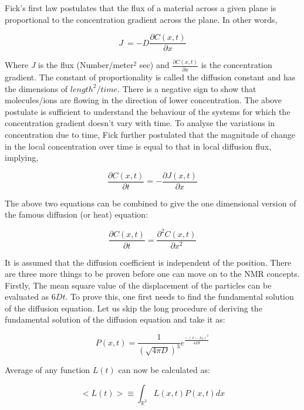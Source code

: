 		Fick's first law postulates that the flux of a material across a given
		plane is proportional to the concentration gradient across the plane.
		In other words,

		\begin{equation}
		J\ =-D\frac{\partial C(x,t)}{\partial x}
		\end{equation}


		Where \emph{J} is the flux (Number/meter$^{2}$ sec) and \emph{$\frac{\partial C(x,t)}{\partial x}$}
		is the concentration gradient. The constant of proportionality is
		called the diffusion constant and has the dimensions of $length^{2}/time$.
		There is a negative sign to show that molecules/ions are flowing in
		the direction of lower concentration. The above postulate is sufficient
		to understand the behaviour of the systems for which the concentration
		gradient doesn't vary with time. To analyse the variations in concentration
		due to time, Fick further postulated that the magnitude of change
		in the local concentration over time is equal to that in local diffusion
		flux, implying,

		\begin{equation}
		\frac{\partial C(x,t)}{\partial t}=-\frac{\partial J(x,t)}{\partial x}
		\end{equation}


		The above two equations can be combined to give the one dimensional
		version of the famous diffusion (or heat) equation:

		\[
		\frac{\partial C(x,t)}{\partial t}=\frac{\partial^{2}C(x,t)}{\partial x^{2}}
		\]


		It is assumed that the diffusion coefficient is independent of the
		position. There are three more things to be proven before one can
		move on to the NMR concepts. Firstly, The mean square value of the
		displacement of the particles can be evaluated as $6Dt.$ To prove
		this, one first needs to find the fundamental solution of the diffusion
		equation. Let us skip the long procedure of deriving the fundamental
		solution of the diffusion equation and take it as:

		\begin{equation}
		P(x,t)=\frac{1}{(\sqrt{4\pi D})^{3}}e^{\frac{-(x-x_{0})^{2}}{4Dt}}
		\end{equation}


		Average of any function $L(t)$ can now be calculated as:

		\begin{equation}
		<L(t)>\equiv\int_{\mathbb{R}^{3}}L(x,t)P(x,t)dx
		\end{equation}


